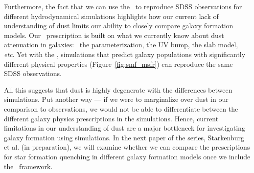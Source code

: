 Furthermore, the fact that we can use the \eda~to reproduce SDSS observations 
for different hydrodynamical simulations highlights how our current lack of 
understanding of dust limits our ability to closely compare galaxy
formation models. 
Our \eda~prescription is built on what we currently know about dust attenuation
in galaxies: \eg~the \citealt{noll2009} parameterization, the UV bump, the slab
model, \emph{etc}.
Yet with the \eda, simulations that predict galaxy populations with
significantly different physical properties (Figure~\ref{fig:smf_msfr}) can
reproduce the same SDSS observations. 

All this suggests that dust is highly degenerate with the differences between simulations. 
Put another way --- if we were to marginalize over dust in our comparison to
observations, we would not be able to differentiate between the different
galaxy physics prescriptions in the simulations. 
Hence, current limitations in our understanding of dust are a major bottleneck
for investigating galaxy formation using simulations.
In the next paper of the series, Starkenburg et al. (in preparation), we
will examine whether we can compare the prescriptions for star formation
quenching in different galaxy formation models once we include the
\eda~framework.


